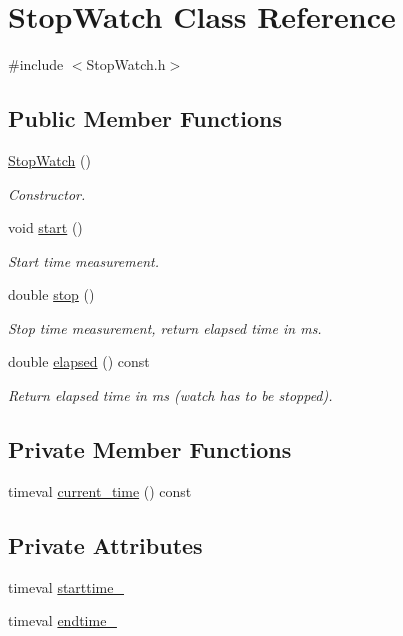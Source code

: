 \hypertarget{classStopWatch}{}\section{Stop\+Watch Class Reference}
\label{classStopWatch}


{\ttfamily \#include $<$Stop\+Watch.\+h$>$}

\subsection*{Public Member Functions}
\begin{DoxyCompactItemize}
\item 
\hyperlink{classStopWatch_ad715945060eeb23baa3c036ad19b1edb}{Stop\+Watch} ()
\begin{DoxyCompactList}\small\item\em Constructor. \end{DoxyCompactList}\item 
void \hyperlink{classStopWatch_a09a3c8f9ab03d7b28e4f8b90a833974e}{start} ()
\begin{DoxyCompactList}\small\item\em Start time measurement. \end{DoxyCompactList}\item 
double \hyperlink{classStopWatch_a14c40846cb1cd3e0d576d59b2cda14a0}{stop} ()
\begin{DoxyCompactList}\small\item\em Stop time measurement, return elapsed time in ms. \end{DoxyCompactList}\item 
double \hyperlink{classStopWatch_a37e3cfc0cec9a636a645adcaf228a272}{elapsed} () const 
\begin{DoxyCompactList}\small\item\em Return elapsed time in ms (watch has to be stopped). \end{DoxyCompactList}\end{DoxyCompactItemize}
\subsection*{Private Member Functions}
\begin{DoxyCompactItemize}
\item 
timeval \hyperlink{classStopWatch_a11c7e8fc779cb1e0d13c0676342dbe35}{current\+\_\+time} () const 
\end{DoxyCompactItemize}
\subsection*{Private Attributes}
\begin{DoxyCompactItemize}
\item 
timeval \hyperlink{classStopWatch_ada5556538f0ebec66b6e45b846ca3864}{starttime\+\_\+}
\item 
timeval \hyperlink{classStopWatch_ac4092981269811b221e31ab5bc0a8ce2}{endtime\+\_\+}
\end{DoxyCompactItemize}



